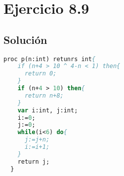 \documentclass[11pt, a4paper, titlepage]{article}
\begin{document}
\newpage

\section*{Ejercicio 8.9}
\subsection*{Solución}
\begin{lstlisting}[language=pascal]
  proc p(n:int) retunrs int{
    if (n+4 > 10 ^ 4-n < 1) then{
      return 0;
    }
    if (n+4 > 10) then{
      return n+8;
    }
    var i:int, j:int;
    i:=0;
    j:=0;
    while(i<6) do{
      j:=j+n;
      i:=i+1;
    }
    return j;
  }
\end{lstlisting}
\end{document}
